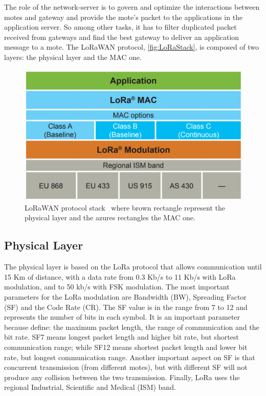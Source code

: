 The role of the network-server is to govern and optimize the interactions between motes and gateway and provide the mote's packet to the applications in the application server.
% 
So among other tasks, it has to filter duplicated packet received from gateways and find the best gateway to deliver an application message to a mote.
% 
The LoRaWAN protocol, \autoref{fig:LoRaStack}, is composed of two layers: the  physical layer and the MAC one.

\begin{figure}[h]
    \centering
    \includegraphics{figures/loraStack.png}
    \caption{LoRaWAN protocol stack~\cite{loraalliance2020} where brown rectangle represent the physical layer and the azures rectangles the MAC one.}
    \label{fig:LoRaStack}
\end{figure}

\subsection{Physical Layer}
The physical layer is based on the LoRa protocol that allows communication until 15 Km of distance, with a data rate from 0.3 Kb/s to 11 Kb/s with LoRa modulation, and to 50 kb/s with FSK modulation.
% 
The most important parameters for the LoRa modulation are Bandwidth (BW), Spreading Factor (SF) and the Code Rate (CR).
% 
The SF value is in the range from 7 to 12 and represents the number of bits in each symbol.
% 
It is an important parameter because define: the maximum packet length, the range of communication and the bit rate.
% 
SF7 means longest packet length and higher bit rate, but shortest communication range; while SF12 means shortest packet length and lower bit rate, but longest communication range.
% 
Another important aspect on SF is that concurrent transmission (from different motes), but with different SF will not produce any collision between the two transmission.
% 
Finally, LoRa uses the regional Industrial, Scientific and Medical (ISM) band.

